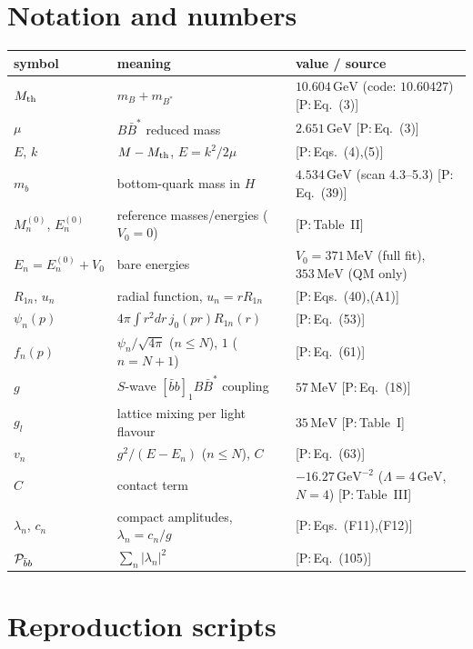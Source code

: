 \documentclass[11pt,a4paper]{article}
\newcommand{\tagP}[1]{\textcolor{blue!65!black}{\textsf{\small[P:\,#1]}}}
\newcommand{\BBst}{B\bar B^*}
\newcommand{\Mth}{M_{\rm th}}
\newcommand{\Pbb}{{\cal P}_{\bar bb}}
\renewcommand{\GeV}{\,\mathrm{GeV}}
\renewcommand{\MeV}{\,\mathrm{MeV}}
\begin{document}
\appendix

\section{Notation and numbers}

\begin{center}
\small
\begin{tabular}{lll}
\toprule
symbol & meaning & value / source\\
\midrule
$\Mth$ & $m_B+m_{B^*}$ & $10.604\GeV$ (code: $10.60427$) \tagP{Eq.~(3)}\\
$\mu$ & $\BBst$ reduced mass & $2.651\GeV$ \tagP{Eq.~(3)}\\
$E$, $k$ & $M-\Mth$, $E=k^2/2\mu$ & \tagP{Eqs.~(4),(5)}\\
$m_b$ & bottom-quark mass in $H$ & $4.534\GeV$ (scan 4.3--5.3) \tagP{Eq.~(39)}\\
$M_n^{(0)}$, $E_n^{(0)}$ & reference masses/energies ($V_0=0$) & \tagP{Table~II}\\
$E_n=E_n^{(0)}+V_0$ & bare energies & $V_0=371\MeV$ (full fit), $353\MeV$ (QM only)\\
$R_{1n}$, $u_n$ & radial function, $u_n=rR_{1n}$ & \tagP{Eqs.~(40),(A1)}\\
$\psi_n(p)$ & $4\pi\int r^2dr\,j_0(pr)R_{1n}(r)$ & \tagP{Eq.~(53)}\\
$f_n(p)$ & $\psi_n/\sqrt{4\pi}$ ($n\le N$), $1$ ($n=N+1$) & \tagP{Eq.~(61)}\\
$g$ & $S$-wave $[\bar bb]_1\BBst$ coupling & $57\MeV$ \tagP{Eq.~(18)}\\
$g_l$ & lattice mixing per light flavour & $35\MeV$ \tagP{Table~I}\\
$v_n$ & $g^2/(E-E_n)$ ($n\le N$), $C$ & \tagP{Eq.~(63)}\\
$C$ & contact term & $-16.27\GeV^{-2}$ ($\Lambda=4\GeV$, $N=4$) \tagP{Table~III}\\
$\lambda_n$, $c_n$ & compact amplitudes, $\lambda_n=c_n/g$ & \tagP{Eqs.~(F11),(F12)}\\
$\Pbb$ & $\sum_n|\lambda_n|^2$ & \tagP{Eq.~(105)}\\
\bottomrule
\end{tabular}
\end{center}

\section{Reproduction scripts}
\end{document}
